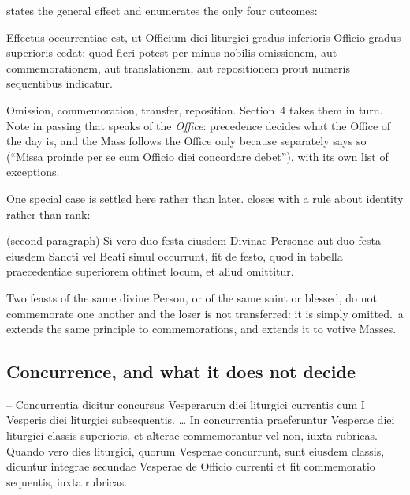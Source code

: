  states the general effect and enumerates the only four outcomes:

\begin{rulebox}{}
Effectus occurrentiae est, ut Officium diei liturgici gradus inferioris
Officio gradus superioris cedat: quod fieri potest per minus nobilis
omissionem, aut commemorationem, aut translationem, aut repositionem prout
numeris sequentibus indicatur.
\end{rulebox}

\noindent
Omission, commemoration, transfer, reposition. Section~4 takes them in turn.
Note in passing that  speaks of the \emph{Office}: precedence decides
what the Office of the day is, and the Mass follows the Office only because
 separately says so (``Missa proinde per se cum Officio diei
concordare debet''), with its own list of exceptions.

One special case is settled here rather than later.  closes with a rule
about identity rather than rank:

\begin{rulebox}{ (second paragraph)}
Si vero duo festa eiusdem Divinae Personae aut duo festa eiusdem Sancti vel
Beati simul occurrunt, fit de festo, quod in tabella praecedentiae superiorem
obtinet locum, et aliud omittitur.
\end{rulebox}

\noindent
Two feasts of the same divine Person, or of the same saint or blessed, do not
commemorate one another and the loser is not transferred: it is simply
omitted. \,a extends the same principle to commemorations, and
 extends it to votive Masses.

\subsection{Concurrence, and what it does not decide}

\begin{rulebox}{--}
Concurrentia dicitur concursus Vesperarum diei liturgici currentis cum I
Vesperis diei liturgici subsequentis. \dots{} In concurrentia praeferuntur
Vesperae diei liturgici classis superioris, et alterae commemorantur vel non,
iuxta rubricas. Quando vero dies liturgici, quorum Vesperae concurrunt, sunt
eiusdem classis, dicuntur integrae secundae Vesperae de Officio currenti et
fit commemoratio sequentis, iuxta rubricas.
\end{rulebox}

